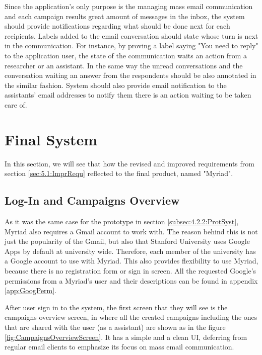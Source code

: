 Since the application's only purpose is the managing mass email communication and each campaign results great amount of messages in the inbox, the system should provide notifications regarding what should be done next for each recipients. Labels added to the email conversation should state whose turn is next in the communication. For instance, by proving a label saying "You need to reply" to the application user, the state of the communication waits an action from a researcher or an assistant. In the same way the unread conversations and the conversation waiting an answer from the respondents should be also annotated in the similar fashion. System should also provide email notification to the assistants' email addresses to notify them there is an action waiting to be taken care of.

\section{Final System}
\label{sec:5.2:FinaSyst}
In this section, we will see that how the revised and improved requirements from section \ref{sec:5.1:ImprRequ} reflected to the final product, named "Myriad".

\subsection{Log-In and Campaigns Overview}
\label{subsec:5.2.1:CampOver}

As it was the same case for the prototype in section \ref{subsec:4.2.2:ProtSyst}, Myriad also requires a Gmail account to work with. The reason behind this is not just the popularity of the Gmail, but also that Stanford University uses Google Apps by default at university wide. Therefore, each member of the university has a Google account to use with Myriad. This also provides flexibility to use Myriad, because there is no registration form or sign in screen. All the requested Google's permissions from a Myriad's user and their descriptions can be found in appendix \ref{app:GoogPerm}.
\vspace{1cm}

After user sign in to the system, the first screen that they will see is the campaigns overview screen, in where all the created campaigns including the ones that are shared with the user (as a assistant) are shown as in the figure \ref{fig:CampaignsOverviewScreen}. It has a simple and a clean \ac{UI}, deferring from regular email clients to emphasize its focus on mass email communication.

